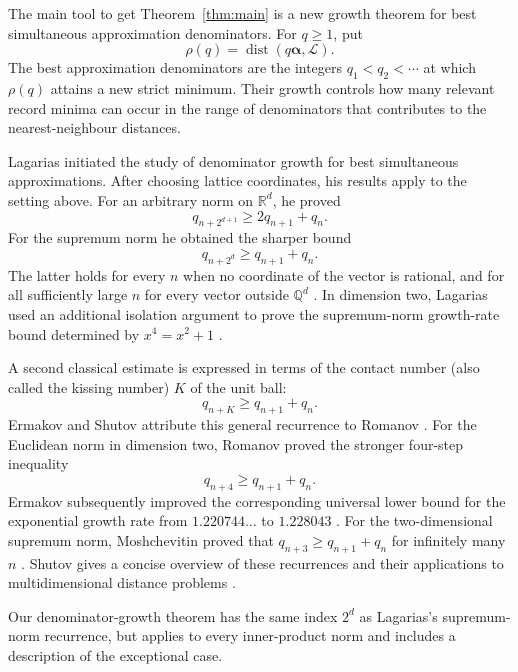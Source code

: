 \documentclass[11pt,reqno]{amsart}
\theoremstyle{definition}
\newcommand{\R}{\mathbb R}
\newcommand{\0}{\mbf 0}%
\def\R{\mathbb R}
\newcommand{\cL}{\mathcal L}
\newcommand{\balpha}{\boldsymbol{\alpha}}
\newcommand{\dist}{\operatorname{dist}}
\begin{document}
The main tool to get Theorem~\ref{thm:main} is a new growth theorem for best
simultaneous approximation denominators. For $q\ge1$, put
$$
 \rho(q)=\dist(q\balpha,\cL).
$$
The best approximation denominators are the integers
$q_1<q_2<\cdots$ at which $\rho(q)$ attains a new strict minimum. Their growth
controls how many relevant record minima can occur in the range of
denominators that contributes to the nearest-neighbour distances.

Lagarias \cite{Lagarias1982} initiated the study of denominator growth for best
simultaneous approximations. After choosing lattice coordinates, his results
apply to the setting above. For an arbitrary norm on $\R^d$, he proved
\begin{equation}\label{eq:Lagarias-general}
 q_{n+2^{d+1}}\ge 2q_{n+1}+q_n.
\end{equation}
For the supremum norm he obtained the sharper bound
\begin{equation}\label{eq:Lagarias-sup}
 q_{n+2^d}\ge q_{n+1}+q_n.
\end{equation}
The latter holds for every $n$ when no coordinate of the vector is rational,
and for all sufficiently large $n$ for every vector outside $\mathbb Q^d$
\cite[Theorems~2.2--2.3]{Lagarias1982}. In dimension two, Lagarias used an
additional isolation argument to prove the supremum-norm growth-rate bound
determined by $x^4=x^2+1$ \cite[Theorem~1.2 and
Corollary~3.2]{Lagarias1982}.

A second classical estimate is expressed in terms of the contact number (also
called the kissing number) $K$ of the unit ball:
\begin{equation}\label{eq:contact-growth}
 q_{n+K}\ge q_{n+1}+q_n.
\end{equation}
Ermakov and Shutov attribute this general recurrence to Romanov
\cite{Romanov2006,Ermakov2010,Shutov2024}. For the Euclidean norm in dimension
two, Romanov proved the stronger four-step inequality
$$
 q_{n+4}\ge q_{n+1}+q_n.
$$
Ermakov subsequently improved the corresponding universal lower bound for the
exponential growth rate from $1.220744\ldots$ to $1.228043$
\cite{Ermakov2010}. For the two-dimensional supremum norm, Moshchevitin proved
that $q_{n+3}\ge q_{n+1}+q_n$ for infinitely many $n$
\cite{Moshchevitin2005}. Shutov gives a concise overview of these recurrences
and their applications to multidimensional distance problems
\cite{Shutov2024}.

Our denominator-growth theorem has the same index $2^d$ as Lagarias's
supremum-norm recurrence, but applies to every inner-product norm and includes
a description of the exceptional case.
\end{document}

